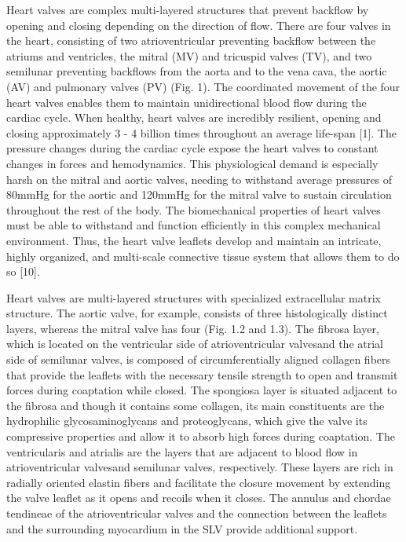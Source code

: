 Heart valves are complex multi-layered structures that prevent backflow by opening and closing depending on the direction of flow. There are four valves in the heart, consisting of two atrioventricular preventing backflow between the atriums and ventricles, the mitral (MV) and tricuspid valves (TV), and two semilunar preventing backflows from the aorta and to the vena cava, the aortic (AV) and pulmonary valves (PV) (Fig. 1). The coordinated movement of the four heart valves enables them to maintain unidirectional blood flow during the cardiac cycle. When healthy, heart valves are incredibly resilient, opening and closing approximately 3 - 4 billion times throughout an average life-span [1]. The pressure changes during the cardiac cycle expose the heart valves to constant changes in forces and hemodynamics. This physiological demand is especially harsh on the mitral and aortic valves, needing to withstand average pressures of 80mmHg for the aortic and 120mmHg for the mitral valve to sustain circulation throughout the rest of the body. The biomechanical properties of heart valves must be able to withstand and function efficiently in this complex mechanical environment. Thus, the heart valve leaflets develop and maintain an intricate, highly organized, and multi-scale connective tissue system that allows them to do so [10]. 

Heart valves are multi-layered structures with specialized extracellular matrix structure. The aortic valve, for example, consists of three histologically distinct layers, whereas the mitral valve has four (Fig. 1.2 and 1.3). The fibrosa layer, which is located on the ventricular side of atrioventricular valvesand the atrial side of semilunar valves, is composed of circumferentially aligned collagen fibers that provide the leaflets with the necessary tensile strength to open and transmit forces during coaptation while closed. The spongiosa layer is situated adjacent to the fibrosa and though it contains some collagen, its main constituents are the hydrophilic glycosaminoglycans and proteoglycans, which give the valve its compressive properties and allow it to absorb high forces during coaptation. The ventricularis and atrialis are the layers that are adjacent to blood flow in atrioventricular valvesand semilunar valves, respectively. These layers are rich in radially oriented elastin fibers and facilitate the closure movement by extending the valve leaflet as it opens and recoils when it closes. The annulus and chordae tendineae of the atrioventricular valves and the connection between the leaflets and the surrounding myocardium in the SLV provide additional support. 
